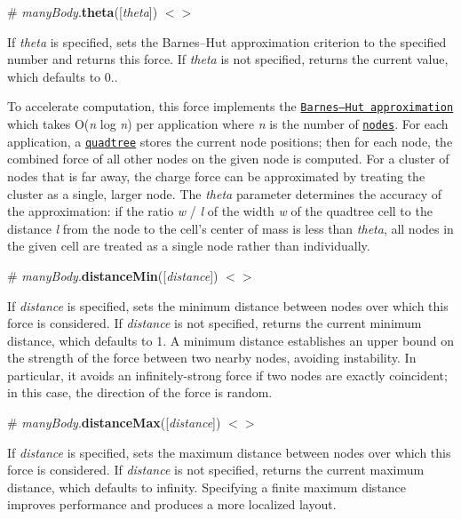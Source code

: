 \label{_manyBody_theta}%
\# {\itshape many\+Body}.{\bfseries theta}(\mbox{[}{\itshape theta}\mbox{]}) \href{https://github.com/d3/d3-force/blob/master/src/manyBody.js#L109}{\tt $<$$>$}

If {\itshape theta} is specified, sets the Barnes–\+Hut approximation criterion to the specified number and returns this force. If {\itshape theta} is not specified, returns the current value, which defaults to 0..

To accelerate computation, this force implements the \href{http://en.wikipedia.org/wiki/Barnes–Hut_simulation}{\tt Barnes–\+Hut approximation} which takes O({\itshape n} log {\itshape n}) per application where {\itshape n} is the number of \href{#simulation_nodes}{\tt nodes}. For each application, a \href{https://github.com/d3/d3-quadtree}{\tt quadtree} stores the current node positions; then for each node, the combined force of all other nodes on the given node is computed. For a cluster of nodes that is far away, the charge force can be approximated by treating the cluster as a single, larger node. The {\itshape theta} parameter determines the accuracy of the approximation\+: if the ratio {\itshape w} / {\itshape l} of the width {\itshape w} of the quadtree cell to the distance {\itshape l} from the node to the cell’s center of mass is less than {\itshape theta}, all nodes in the given cell are treated as a single node rather than individually.

\label{_manyBody_distanceMin}%
\# {\itshape many\+Body}.{\bfseries distance\+Min}(\mbox{[}{\itshape distance}\mbox{]}) \href{https://github.com/d3/d3-force/blob/master/src/manyBody.js#L101}{\tt $<$$>$}

If {\itshape distance} is specified, sets the minimum distance between nodes over which this force is considered. If {\itshape distance} is not specified, returns the current minimum distance, which defaults to 1. A minimum distance establishes an upper bound on the strength of the force between two nearby nodes, avoiding instability. In particular, it avoids an infinitely-\/strong force if two nodes are exactly coincident; in this case, the direction of the force is random.

\label{_manyBody_distanceMax}%
\# {\itshape many\+Body}.{\bfseries distance\+Max}(\mbox{[}{\itshape distance}\mbox{]}) \href{https://github.com/d3/d3-force/blob/master/src/manyBody.js#L105}{\tt $<$$>$}

If {\itshape distance} is specified, sets the maximum distance between nodes over which this force is considered. If {\itshape distance} is not specified, returns the current maximum distance, which defaults to infinity. Specifying a finite maximum distance improves performance and produces a more localized layout.

